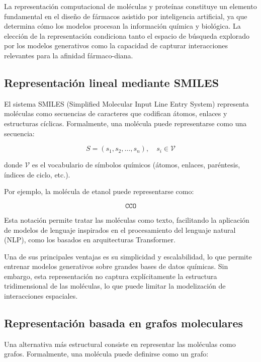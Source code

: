 \documentclass[IB]{TFUOC}%
\begin{document}
La representación computacional de moléculas y proteínas constituye un elemento fundamental en el diseño de fármacos asistido por inteligencia artificial, ya que determina cómo los modelos procesan la información química y biológica. La elección de la representación condiciona tanto el espacio de búsqueda explorado por los modelos generativos como la capacidad de capturar interacciones relevantes para la afinidad fármaco-diana.

\subsection{Representación lineal mediante SMILES}

El sistema SMILES (Simplified Molecular Input Line Entry System) representa moléculas como secuencias de caracteres que codifican átomos, enlaces y estructuras cíclicas. Formalmente, una molécula puede representarse como una secuencia:

\begin{equation}
S = (s_1, s_2, \dots, s_n), \quad s_i \in \mathcal{V}
\end{equation}

donde $\mathcal{V}$ es el vocabulario de símbolos químicos (átomos, enlaces, paréntesis, índices de ciclo, etc.).

Por ejemplo, la molécula de etanol puede representarse como:

\begin{equation}
\texttt{CCO}
\end{equation}

Esta notación permite tratar las moléculas como texto, facilitando la aplicación de modelos de lenguaje inspirados en el procesamiento del lenguaje natural (NLP), como los basados en arquitecturas Transformer.

Una de sus principales ventajas es su simplicidad y escalabilidad, lo que permite entrenar modelos generativos sobre grandes bases de datos químicas. Sin embargo, esta representación no captura explícitamente la estructura tridimensional de las moléculas, lo que puede limitar la modelización de interacciones espaciales.

\subsection{Representación basada en grafos moleculares}

Una alternativa más estructural consiste en representar las moléculas como grafos. Formalmente, una molécula puede definirse como un grafo:
\end{document}
